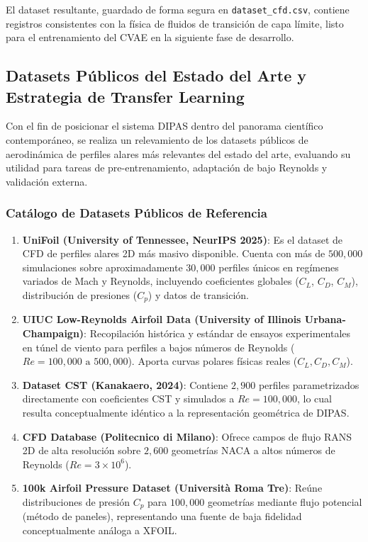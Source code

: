 \begin{enumerate}
El dataset resultante, guardado de forma segura en \texttt{dataset\_cfd.csv}, contiene registros consistentes con la física de fluidos de transición de capa límite, listo para el entrenamiento del CVAE en la siguiente fase de desarrollo.

\subsection{Datasets Públicos del Estado del Arte y Estrategia de Transfer Learning}
\label{subsec:datasets_publicos}

Con el fin de posicionar el sistema DIPAS dentro del panorama científico contemporáneo, se realiza un relevamiento de los datasets públicos de aerodinámica de perfiles alares más relevantes del estado del arte, evaluando su utilidad para tareas de pre-entrenamiento, adaptación de bajo Reynolds y validación externa.

\subsubsection{Catálogo de Datasets Públicos de Referencia}
\begin{enumerate}
    \item \textbf{UniFoil (University of Tennessee, NeurIPS 2025)}: Es el dataset de CFD de perfiles alares 2D más masivo disponible. Cuenta con más de $500{,}000$ simulaciones sobre aproximadamente $30{,}000$ perfiles únicos en regímenes variados de Mach y Reynolds, incluyendo coeficientes globales ($C_L$, $C_D$, $C_M$), distribución de presiones ($C_p$) y datos de transición.
    \item \textbf{UIUC Low-Reynolds Airfoil Data (University of Illinois Urbana-Champaign)}: Recopilación histórica y estándar de ensayos experimentales en túnel de viento para perfiles a bajos números de Reynolds ($Re = 100{,}000\text{ a }500{,}000$). Aporta curvas polares físicas reales ($C_L, C_D, C_M$).
    \item \textbf{Dataset CST (Kanakaero, 2024)}: Contiene $2{,}900$ perfiles parametrizados directamente con coeficientes CST y simulados a $Re = 100{,}000$, lo cual resulta conceptualmente idéntico a la representación geométrica de DIPAS.
    \item \textbf{CFD Database (Politecnico di Milano)}: Ofrece campos de flujo RANS 2D de alta resolución sobre $2{,}600$ geometrías NACA a altos números de Reynolds ($Re = 3 \times 10^6$).
    \item \textbf{100k Airfoil Pressure Dataset (Università Roma Tre)}: Reúne distribuciones de presión $C_p$ para $100{,}000$ geometrías mediante flujo potencial (método de paneles), representando una fuente de baja fidelidad conceptualmente análoga a XFOIL.
\end{enumerate}


\end{enumerate}
